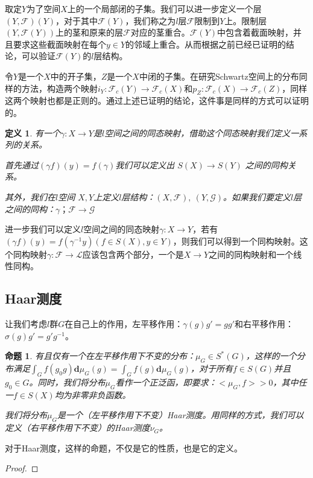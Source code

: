 \documentclass{article}
\newtheorem{definition}{定义}
\newtheorem{proposition}{命题}
\newtheorem{proof}{证明}
\begin{document}
取定$Y$为了空间$X$上的一个局部闭的子集。我们可以进一步定义一个层$(Y,\mathcal{F})(Y)$，对于其中$\mathcal{F}(Y)$，我们称之为$l$层$\mathcal{F}$限制到$Y$上。限制层$(Y,\mathcal{F}(Y))$上的茎和原来的层$\mathcal{F}$对应的茎重合。$\mathcal{F}(Y)$中包含着截面映射，并且要求这些截面映射在每个$y\in Y$的邻域上重合。从而根据之前已经已证明的结论，可以验证$\mathcal{F}(Y)$的$l$层结构。

令$Y$是一个$X$中的开子集，$Z$是一个$X$中闭的子集。在研究Schwartz空间上的分布同样的方法，构造两个映射$i_{Y}:\mathcal{F}_{c}(Y)\rightarrow\mathcal{F}_{c}(X)$和$p_{Z}:\mathcal{F}_{c}(X)\rightarrow\mathcal{F}_{c}(Z)$，同样这两个映射也都是正则的。通过上述已证明的结论，这件事是同样的方式可以证明的。

\begin{definition}
有一个$\gamma:X\rightarrow Y$是$l$空间之间的同态映射，借助这个同态映射我们定义一系列的关系。

首先通过$(\gamma f)(y)=f(\gamma)$我们可以定义出 $S(X)\rightarrow S(Y)$ 之间的同构关系。

其外，我们在$l$空间 $X, Y$上定义$l$层结构：$(X,\mathcal{F}),\ (Y,\mathcal{G})$。如果我们要定义$l$层之间的同构：$\gamma；\mathcal{F}\rightarrow\mathcal{G}$
\end{definition}






进一步我们可以定义$l$空间之间的同态映射$\gamma:X\rightarrow Y$，若有$(\gamma f)(y)=f(\gamma^{-1}y)(f\in S(X),y\in Y)$，则我们可以得到一个同构映射。这个同构映射$\gamma:\mathcal{F}\rightarrow \mathcal{L}$应该包含两个部分，一个是$X\rightarrow Y$之间的同构映射和一个线性同构。


\subsection{Haar测度}
让我们考虑$l$群$G$在自己上的作用，左平移作用：$\gamma(g)g'=gg'$和右平移作用：$\sigma(g)g'=g'g^{-1}$。
\begin{proposition}
    有且仅有一个在左平移作用下不变的分布：$\mu_{G}\in S^{*}(G)$，这样的一个分布满足$\int_{G}f(g_{0}g)\mathbf{d}\mu_{G}(g)=\int_{G}f(g)\mathbf{d}\mu_{G}(g)$，对于所有$f\in S(G)$并且$g_{0}\in G$。同时，我们将分布$\mu_{G}$看作一个正泛函，即要求：$<\mu_{G},f>>0$，其中任一$f\in S(X)$均为非零非负函数。
    
    我们将分布$\mu_{G}$是一个（左平移作用下不变）Haar测度。用同样的方式，我们可以定义（右平移作用下不变）的Haar测度$\nu_{G}$。
\end{proposition}
对于Haar测度，这样的命题，不仅是它的性质，也是它的定义。

\begin{proof}

\end{proof}
\end{document}
